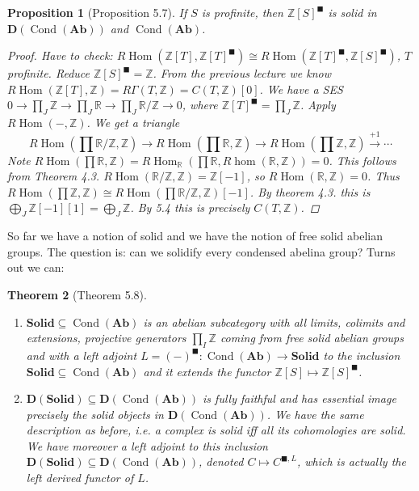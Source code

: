 \documentclass[12pt]{article}
\theoremstyle{darkgreentheorem}
\newtheorem{thm}{Theorem}[section]
\newtheorem{prop}[thm]{Proposition}
\theoremstyle{darkbluedefinition}
\theoremstyle{darkredexample}
\theoremstyle{remark}
\newcommand{\Z}{\mathbb{Z}}
\newcommand{\R}{\mathbb{R}}
\newcommand{\1}{\mathbbm{1}}
\newcommand{\Ab}{\mathbf{Ab}}
\newcommand{\D}{\mathbf{D}}
\newcommand{\Solid}{\mathbf{Solid}}
\DeclareMathOperator{\Hom}{Hom}
\DeclareMathOperator{\Cond}{Cond}
\newcommand{\sub}{\subseteq}
\newcommand{\solid}{^{\blacksquare}}
\begin{document}
\begin{prop}[Proposition 5.7]
    If $S$ is profinite, then $\Z[S]\solid$ is solid in $\D(\Cond(\Ab))$ and $\Cond(\Ab)$.
    \begin{proof}
	Have to check: $R\Hom(\Z[T],\Z[T]\solid)\cong R\Hom(\Z[T]\solid,\Z[S]\solid)$, $T$ profinite.
	Reduce $\Z[S]\solid =\Z$.
	From the previous lecture we know $R\Hom(\Z[T],\Z)=R\Gamma (T,\Z)=C(T,\Z)[0]$.
	We have a SES $0\to \prod_{J}\Z\to \prod_{J}\R\to \prod_{J}\R/\Z\to 0$, where $\Z[T]\solid =\prod_{J}\Z$.
	Apply $R\Hom(-,\Z)$.
	We get a triangle
	\[R\Hom(\prod \R/\Z,\Z)\to R\Hom(\prod \R,\Z)\to R\Hom(\prod \Z,\Z)\xrightarrow{+1}\cdots\]
	Note $R\Hom(\prod \R,\Z)=R\Hom_{\R}(\prod \R, R\hom(\R,\Z))=0$.
	This follows from Theorem 4.3. $R\Hom(\R/\Z,\Z)=\Z[-1]$, so $R\Hom(\R,\Z)=0$.
	Thus $R\Hom(\prod\Z,\Z)\cong R\Hom(\prod \R/\Z,\Z)[-1]$.
	By theorem 4.3. this is $\bigoplus_{J}\Z[-1][1]=\bigoplus_{J}\Z$.
	By 5.4 this is precisely $C(T,\Z)$.
    \end{proof}
\end{prop}

So far we have a notion of solid and we have the notion of free solid abelian groups.
The question is: can we solidify every condensed abelina group?
Turns out we can:

\begin{thm}[Theorem 5.8]
    \begin{enumerate}[label=\roman*)]
	\item $\Solid\sub \Cond(\Ab)$ is an abelian subcategory with all limits, colimits and extensions, projective generators $\prod_{I}\Z$ coming from free solid abelian groups and with a left adjoint $L=(-)\solid\colon \Cond(\Ab)\to \Solid$ to the inclusion $\Solid \sub \Cond(\Ab)$ and it extends the functor $\Z[S]\mapsto \Z[S]\solid$.
	\item $\D(\Solid)\sub \D(\Cond(\Ab))$ is fully faithful and has essential image precisely the solid objects in $\D(\Cond(\Ab))$.
	    We have the same description as before, i.e. a complex is solid iff all its cohomologies are solid.
	    We have moreover a left adjoint to this inclusion $\D(\Solid)\sub \D(\Cond(\Ab))$, denoted $C\mapsto C^{\blacksquare, L}$, which is actually the left derived functor of $L$.
    \end{enumerate}
\end{thm}
\end{document}
